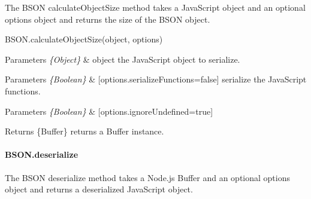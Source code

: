 The B\+S\+ON {\ttfamily calculate\+Object\+Size} method takes a Java\+Script object and an optional options object and returns the size of the B\+S\+ON object.


\begin{DoxyItemize}
\item {\ttfamily B\+S\+O\+N.\+calculate\+Object\+Size(object, options)}
\begin{DoxyItemize}
\item 
\begin{DoxyParams}{Parameters}
{\em \{\+Object\}} & object the Java\+Script object to serialize.\\
\hline
\end{DoxyParams}

\item 
\begin{DoxyParams}{Parameters}
{\em \{\+Boolean\}} & \mbox{[}options.\+serialize\+Functions=false\mbox{]} serialize the Java\+Script functions.\\
\hline
\end{DoxyParams}

\item 
\begin{DoxyParams}{Parameters}
{\em \{\+Boolean\}} & \mbox{[}options.\+ignore\+Undefined=true\mbox{]}\\
\hline
\end{DoxyParams}

\item \begin{DoxyReturn}{Returns}
\{Buffer\} returns a Buffer instance.
\end{DoxyReturn}
\paragraph*{B\+S\+O\+N.\+deserialize}
\end{DoxyItemize}
\end{DoxyItemize}

The B\+S\+ON {\ttfamily deserialize} method takes a Node.\+js Buffer and an optional options object and returns a deserialized Java\+Script object.


